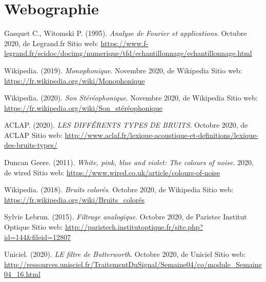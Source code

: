\documentclass[conference,onecolumn]{IEEEtran}
\begin{document}
\section{Webographie}
\renewcommand\refname{}
\begin{flushleft}
\begin{thebibliography}{100}

Gasquet C., Witomski P. (1995).
\textit{Analyse de Fourier et applications}. Octubre 2020, de Legrand.fr Sitio web: \href{https://www.f-legrand.fr/scidoc/docimg/numerique/tfd/echantillonnage/echantillonnage.html}{https://www.f-legrand.fr/scidoc/docimg/numerique/tfd/echantillonnage/echantillonnage.html}

Wikipedia. (2019).
\textit{Monophonique}. Novembre 2020, de Wikipedia Sitio web: \href{https://fr.wikipedia.org/wiki/Monophonique}{https://fr.wikipedia.org/wiki/Monophonique}

Wikipedia. (2020).
\textit{Son Stéréophonique}. Novembre 2020, de Wikipedia Sitio web: \href{https://fr.wikipedia.org/wiki/Son_stéréophonique}{https://fr.wikipedia.org/wiki/Son\_stéréophonique}

ACLAP. (2020). 
\textit{LES DIFFÉRENTS TYPES DE BRUITS}. Octobre 2020, de ACLAP Sitio web: \href{http://www.aclaf.fr/lexique-acoustique-et-definitions/lexique-des-bruits-types/}{http://www.aclaf.fr/lexique-acoustique-et-definitions/lexique-des-bruits-types/}

Duncan Geere. (2011).
\textit{White, pink, blue and violet: The colours of noise}. 2020, de wired Sitio web: \href{https://www.wired.co.uk/article/colours-of-noise}{https://www.wired.co.uk/article/colours-of-noise}

Wikipedia. (2018).
\textit{Bruits colorés}. Octobre 2020, de Wikipedia Sitio web: \href{https://fr.wikipedia.org/wiki/Bruits\_colorés}{https://fr.wikipedia.org/wiki/Bruits\_colorés}

Sylvie Lebrun. (2015).
\textit{Filtrage analogique}. Octobre 2020, de Paristec Institut Optique Sitio web: \href{http://paristech.institutoptique.fr/site.php?id=144&fileid=12807}{http://paristech.institutoptique.fr/site.php?id=144\&fileid=12807}

Uniciel. (2020).
\textit{LE filtre de Butterworth}. Octobre 2020, de Uniciel Sitio web: \href{http://ressources.unisciel.fr/TraitementDuSignal/Semaine04/co/module\_Semaine04\_16.html}{http://ressources.unisciel.fr/TraitementDuSignal/Semaine04/co/module\_Semaine04\_16.html}


\end{thebibliography}
\end{flushleft}
\end{document}
